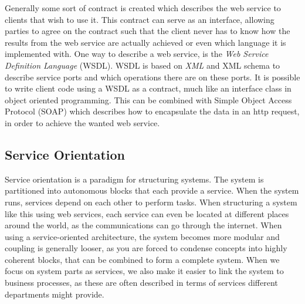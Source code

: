 \noindent
Generally some sort of contract is created which describes the web service to clients that wish to use it. This contract can serve as an interface, allowing parties to agree on the contract such that the client never has to know how the results from the web service are actually achieved or even which language it is implemented with. One way to describe a web service, is the \emph{Web Service Definition Language} (WSDL). WSDL is based on \emph{XML} and XML schema to describe service ports and which operations there are on these ports. It is possible to write client code using a WSDL as a contract, much like an interface class in object oriented programming. This can be combined with Simple Object Access Protocol (SOAP) which describes how to encapsulate the data in an http request, in order to achieve the wanted web service.


\subsection{Service Orientation}
\mrb

\noindent
Service orientation is a paradigm for structuring systems. The system is partitioned into autonomous blocks that each provide a service. When the system runs, services depend on each other to perform tasks. When structuring a system like this using web services, each service can even be located at different places around the world, as the communications can go through the internet. When using a service-oriented architecture, the system becomes more modular and coupling is generally looser, as you are forced to condense concepts into highly coherent blocks, that can be combined to form a complete system. When we focus on system parts as services, we also make it easier to link the system to business processes, as these are often described in terms of services different departments might provide.

